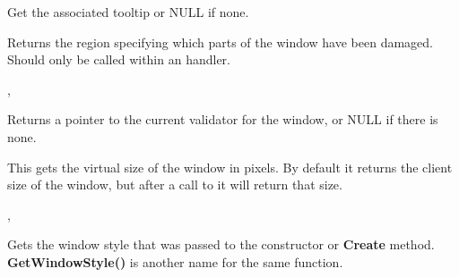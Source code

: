 \label{wxwindowgettooltip}


Get the associated tooltip or NULL if none.


\label{wxwindowgetupdateregion}


Returns the region specifying which parts of the window have been damaged. Should
only be called within an  handler.


,\rtfsp
{}


\label{wxwindowgetvalidator}


Returns a pointer to the current validator for the window, or NULL if there is none.


\label{wxwindowgetvirtualsize}



This gets the virtual size of the window in pixels. By default it
returns the client size of the window, but after a call to
 it will return
that size.




,\rtfsp
{}


\label{wxwindowgetwindowstyleflag}


Gets the window style that was passed to the constructor or {\bf Create}
method. {\bf GetWindowStyle()} is another name for the same function.


\label{wxwindowgetwindowvariant}

